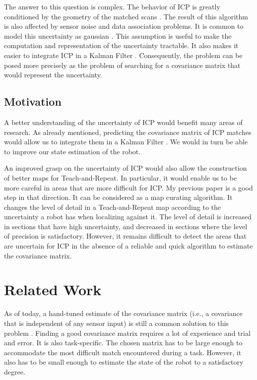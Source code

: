\documentclass[10pt,letterpaper,oneside]{article}
\begin{document}
The answer to this question is complex.
The behavior of \ac{ICP} is greatly conditioned by the geometry of the matched scans \cite{Censi2007}.
The result of this algorithm is also affected by sensor noise and data association problems.
It is common to model this uncertainty as gaussian \cite{Censi2007,Bonnabel2016}.
This assumption is useful to make the computation and representation of the uncertainty tractable.
It also makes it easier to integrate \ac{ICP} in a Kalman Filter \cite{Zhang1994}.
Consequently, the problem can be posed more precisely as the problem of searching for a covariance matrix that would represent the uncertainty.

\subsection{Motivation}
\label{ssec:motivation}

A better understanding of the uncertainty of \ac{ICP} would benefit many areas of research.
As already mentioned, predicting the covariance matrix of \ac{ICP} matches would allow us to integrate them in a Kalman Filter \cite{Zhang1994}.
We would in turn be able to improve our state estimation of the robot.

An improved grasp on the uncertainty of \ac{ICP} would also allow the construction of better maps for Teach-and-Repeat.
In particular, it would enable us to be more careful in areas that are more difficult for \ac{ICP}.
My previous paper \cite{Landry2016} is a good step in that direction.
It can be considered as a map curating algorithm.
It changes the level of detail in a Teach-and-Repeat map according to the uncertainty a robot has when localizing against it.
The level of detail is increased in sections that have high uncertainty, and decreased in sections where the level of precision is satisfactory.
However, it remains difficult to detect the areas that are uncertain for \ac{ICP} in the absence of a reliable and quick algorithm to estimate the covariance matrix.

\section{Related Work}

\label{sec:stateoftheart}

As of today, a hand-tuned estimate of the covariance matrix (i.e., a covariance that is independent of any sensor input) is still a common solution to this problem \cite{VegaBrown2013em}.
Finding a good covariance matrix requires a lot of experience and trial and error.
It is also task-specific.
The chosen matrix has to be large enough to accommodate the most difficult match encountered during a task.
However, it also has to be small enough to estimate the state of the robot to a satisfactory degree.
\end{document}
